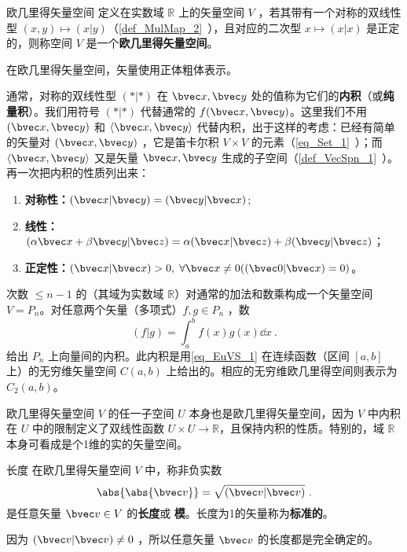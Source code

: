

\begin{definition}{欧几里得矢量空间}\label{def_EuVS_1}
定义在实数域 $\mathbb R$ 上的矢量空间 $V$ ，若其带有一个对称的双线性型 $( x, y)\mapsto( x| y)$（\autoref{def_MulMap_2}~），且对应的二次型 $ x\mapsto( x| x)$ 是正定的，则称空间 $V$ 是一个\textbf{欧几里得矢量空间}。
\end{definition}

在欧几里得矢量空间，矢量使用正体粗体表示。

通常，对称的双线性型 $(*|*)$ 在 $\bvec x,\bvec y$ 处的值称为它们的\textbf{内积}（或\textbf{纯量积}）。我们用符号 $(*|*)$ 代替通常的 $f(\bvec x,\bvec y)$。这里我们不用 $(\bvec x,\bvec y)$ 和 $\langle\bvec x,\bvec y\rangle$ 代替内积，出于这样的考虑：已经有简单的矢量对 $(\bvec x,\bvec y)$ ，它是笛卡尔积 $V\times V$ 的元素（\autoref{eq_Set_1}~）；而 $\langle \bvec x,\bvec y\rangle $ 又是矢量 $\bvec x,\bvec y$ 生成的子空间（\autoref{def_VecSpn_1}~）。
再一次把内积的性质列出来：
\begin{enumerate}
\item \textbf{对称性：}$(\bvec x|\bvec y)=(\bvec y|\bvec x)$;
\item \textbf{线性：}$(\alpha\bvec x+\beta\bvec y|\bvec z)=\alpha(\bvec x|\bvec z)+\beta(\bvec y|\bvec z)$；
\item \textbf{正定性：}$(\bvec x|\bvec x)>0,\;\forall\bvec x\neq0((\bvec 0|\bvec x)=0)$。
\end{enumerate}
\begin{example}{}\label{ex_EuVS_1}
次数 $\leq n-1$ 的（其域为实数域 $\mathbb R$）对通常的加法和数乘构成一个矢量空间 $V=P_n$。对任意两个矢量（多项式）$f,g\in P_n$ ，数 
\begin{equation}\label{eq_EuVS_1}
(f|g)=\int_a^b f(x)g(x)\dd x~.
\end{equation}
给出 $P_n$ 上向量间的内积。此内积是用\autoref{eq_EuVS_1} 在连续函数（区间 $[a,b]$ 上）的无穷维矢量空间 $C(a,b)$ 上给出的。相应的无穷维欧几里得空间则表示为 $C_2(a,b)$。
\end{example}
\begin{example}{}
欧几里得矢量空间 $V$ 的任一子空间 $U$ 本身也是欧几里得矢量空间，因为 $V$ 中内积在 $U$ 中的限制定义了双线性函数 $U\times U\rightarrow\mathbb R$，且保持内积的性质。特别的，域 $\mathbb R$ 本身可看成是个1维的实的矢量空间。
\end{example}
\begin{definition}{长度}\label{def_EuVS_2}
在欧几里得矢量空间 $V$ 中，称非负实数
\begin{equation}
\abs{\abs{\bvec v}}=\sqrt{(\bvec v|\bvec v)}~.
\end{equation}
是任意矢量 $\bvec v\in V$ 的\textbf{长度}或 \textbf{模}。长度为1的矢量称为\textbf{标准的}。
\end{definition}
因为 $(\bvec v|\bvec v)\neq0$ ，所以任意矢量 $\bvec v$ 的长度都是完全确定的。


